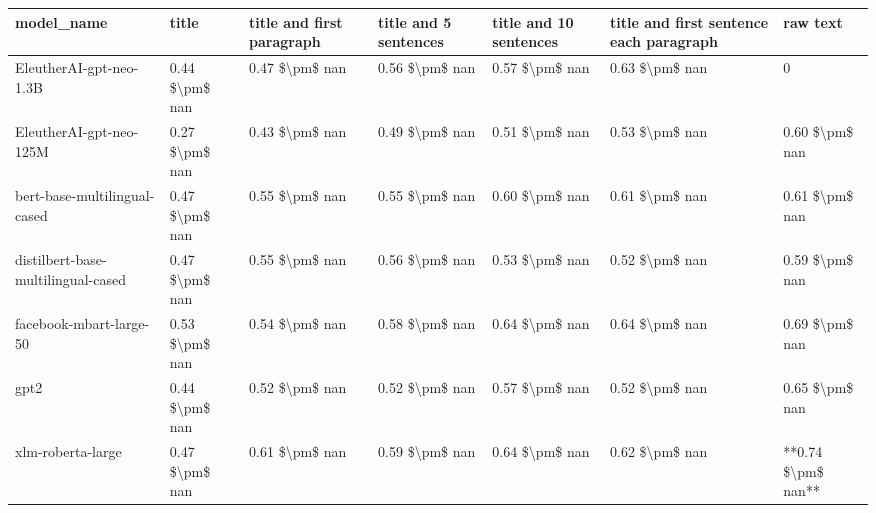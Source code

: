 \begin{tabular}{lllllll}
\toprule
                        model\_name &          title & title and first paragraph & title and 5 sentences & title and 10 sentences & title and first sentence each paragraph &           raw text \\
\midrule
           EleutherAI-gpt-neo-1.3B & 0.44 \$\textbackslash pm\$ nan &            0.47 \$\textbackslash pm\$ nan &        0.56 \$\textbackslash pm\$ nan &         0.57 \$\textbackslash pm\$ nan &                          0.63 \$\textbackslash pm\$ nan &                  0 \\
           EleutherAI-gpt-neo-125M & 0.27 \$\textbackslash pm\$ nan &            0.43 \$\textbackslash pm\$ nan &        0.49 \$\textbackslash pm\$ nan &         0.51 \$\textbackslash pm\$ nan &                          0.53 \$\textbackslash pm\$ nan &     0.60 \$\textbackslash pm\$ nan \\
      bert-base-multilingual-cased & 0.47 \$\textbackslash pm\$ nan &            0.55 \$\textbackslash pm\$ nan &        0.55 \$\textbackslash pm\$ nan &         0.60 \$\textbackslash pm\$ nan &                          0.61 \$\textbackslash pm\$ nan &     0.61 \$\textbackslash pm\$ nan \\
distilbert-base-multilingual-cased & 0.47 \$\textbackslash pm\$ nan &            0.55 \$\textbackslash pm\$ nan &        0.56 \$\textbackslash pm\$ nan &         0.53 \$\textbackslash pm\$ nan &                          0.52 \$\textbackslash pm\$ nan &     0.59 \$\textbackslash pm\$ nan \\
           facebook-mbart-large-50 & 0.53 \$\textbackslash pm\$ nan &            0.54 \$\textbackslash pm\$ nan &        0.58 \$\textbackslash pm\$ nan &         0.64 \$\textbackslash pm\$ nan &                          0.64 \$\textbackslash pm\$ nan &     0.69 \$\textbackslash pm\$ nan \\
                              gpt2 & 0.44 \$\textbackslash pm\$ nan &            0.52 \$\textbackslash pm\$ nan &        0.52 \$\textbackslash pm\$ nan &         0.57 \$\textbackslash pm\$ nan &                          0.52 \$\textbackslash pm\$ nan &     0.65 \$\textbackslash pm\$ nan \\
                 xlm-roberta-large & 0.47 \$\textbackslash pm\$ nan &            0.61 \$\textbackslash pm\$ nan &        0.59 \$\textbackslash pm\$ nan &         0.64 \$\textbackslash pm\$ nan &                          0.62 \$\textbackslash pm\$ nan & **0.74 \$\textbackslash pm\$ nan** \\
\bottomrule
\end{tabular}
